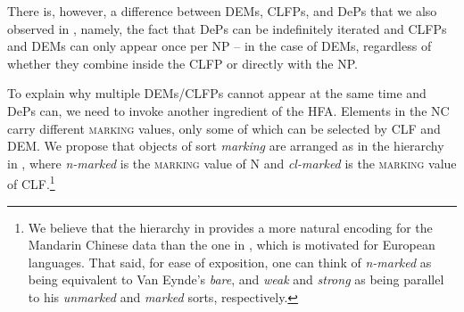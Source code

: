 \documentclass[output=paper,colorlinks,citecolor=brown]{langscibook}
\begin{document}







There is, however, a difference between DEMs, CLFPs, and DePs that we also observed in , namely, the fact that DePs  can be indefinitely iterated and CLFPs and DEMs can only appear once per NP -- in the case of DEMs, regardless of whether they combine inside the CLFP or directly with the NP. 

To explain why multiple DEMs/CLFPs cannot appear at the same time and DePs can, we need to invoke another ingredient of the HFA. Elements in the NC  carry different \textsc{marking} values, only some of which can be selected by CLF and DEM. %
We propose that objects of sort \textit{marking} are  arranged as in the  hierarchy in , where  \textit{n-marked} is the \textsc{marking} value of N and \textit{cl-marked} is  the \textsc{marking} value of CLF.\footnote{We believe that the hierarchy in  provides a more natural encoding for the Mandarin Chinese data than the  one in \citet[167]{VanEynde06a}, which is motivated for European languages. That said, for ease of exposition, one can think of \textit{n-marked} as being equivalent to Van Eynde's \textit{bare}, and \textit{weak} and \textit{strong} as being parallel to his \textit{unmarked} and \textit{marked} sorts, respectively. }
\end{document}
